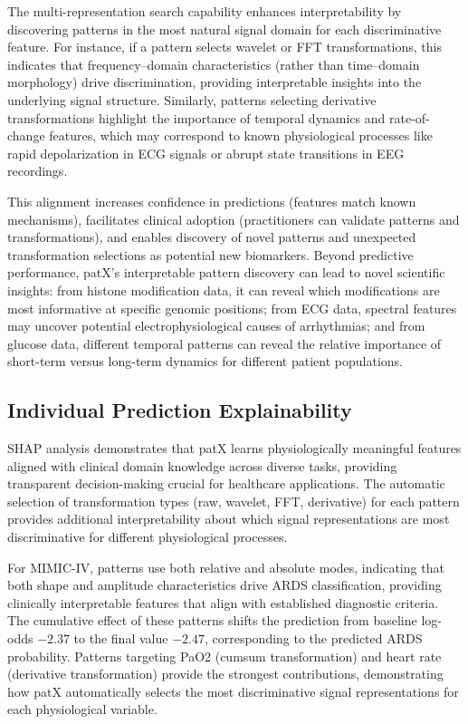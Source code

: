 \documentclass[11pt]{article}
\begin{document}
The multi-representation search capability enhances interpretability by
discovering patterns in the most natural signal domain for each discriminative
feature.
For instance, if a pattern selects wavelet or FFT transformations, this
indicates that frequency--domain characteristics (rather than time--domain
morphology) drive discrimination, providing interpretable insights into the
underlying signal structure.
Similarly, patterns selecting derivative transformations highlight the
importance of temporal dynamics and rate-of-change features, which may
correspond to known physiological processes like rapid depolarization in ECG
signals or abrupt state transitions in EEG recordings.

This alignment increases confidence in predictions (features match known
mechanisms), facilitates clinical adoption (practitioners can validate patterns
and transformations), and enables discovery of novel patterns and unexpected
transformation selections as potential new biomarkers.
Beyond predictive performance, patX's interpretable pattern discovery can lead
to novel scientific insights: from histone modification data, it can reveal
which modifications are most informative at specific genomic positions; from
ECG data, spectral features may uncover potential electrophysiological causes
of arrhythmias; and from glucose data, different temporal patterns can reveal
the relative importance of short-term versus long-term dynamics for different
patient populations.

\subsection{Individual Prediction Explainability}

SHAP analysis \cite{lundberg2017unified, mosca2022shap} demonstrates that patX learns physiologically meaningful
features aligned with clinical domain knowledge across diverse tasks, providing
transparent decision-making crucial for healthcare applications.
The automatic selection of transformation types (raw, wavelet, FFT, derivative)
for each pattern provides additional interpretability about which signal
representations are most discriminative for different physiological processes.

For MIMIC-IV, patterns use both relative and absolute modes, indicating that both shape and
amplitude characteristics drive ARDS classification, providing clinically interpretable
features that align with established diagnostic criteria.
The cumulative effect of these patterns shifts the prediction from baseline
log-odds $-2.37$ to the final value $-2.47$, corresponding to the predicted ARDS probability.
Patterns targeting PaO2 (cumsum transformation) and heart rate (derivative transformation)
provide the strongest contributions, demonstrating how patX automatically selects the most
discriminative signal representations for each physiological variable.
\end{document}
